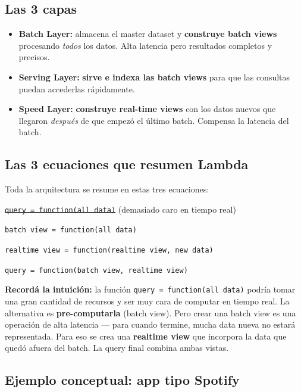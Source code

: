 \documentclass[11pt, a4paper]{article}
\begin{document}
\subsection{Las 3 capas}
\begin{itemize}
	\item \textbf{Batch Layer:} almacena el master dataset y \textbf{construye batch views} procesando \textit{todos} los datos. Alta latencia pero resultados completos y precisos.
	\item \textbf{Serving Layer:} \textbf{sirve e indexa las batch views} para que las consultas puedan accederlas rápidamente.
	\item \textbf{Speed Layer:} \textbf{construye real-time views} con los datos nuevos que llegaron \textit{después} de que empezó el último batch. Compensa la latencia del batch.
\end{itemize}

\subsection{Las 3 ecuaciones que resumen Lambda}

Toda la arquitectura se resume en estas tres ecuaciones:

\begin{center}
	\texttt{\sout{query = function(all data)}} \quad (demasiado caro en tiempo real)

	\vspace{0.5em}
	\texttt{batch view = function(all data)}

	\texttt{realtime view = function(realtime view, new data)}

	\texttt{query = function(batch view, realtime view)}
\end{center}

\begin{recallbox}
	\textbf{Recordá la intuición:} la función \texttt{query = function(all data)} podría tomar una gran cantidad de recursos y ser muy cara de computar en tiempo real. La alternativa es \textbf{pre-computarla} (batch view). Pero crear una batch view es una operación de alta latencia --- para cuando termine, mucha data nueva no estará representada. Para eso se crea una \textbf{realtime view} que incorpora la data que quedó afuera del batch. La query final combina ambas vistas.
\end{recallbox}

\subsection{Ejemplo conceptual: app tipo Spotify}
\end{document}
